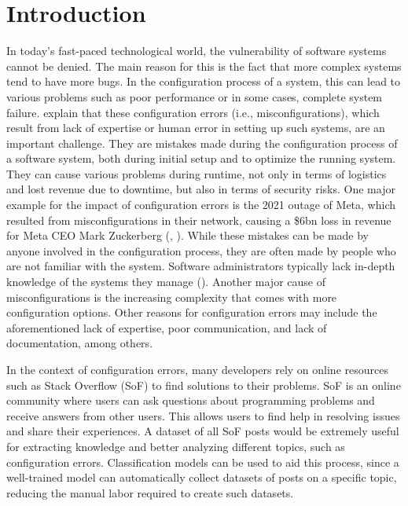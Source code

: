 \documentclass[english,bachelor]{swsLeipzig}
\begin{document}
\chapter{Introduction}\label{introduction}
In today's fast-paced technological world, the vulnerability of software systems cannot be denied. The main reason
for this is the fact that more complex systems tend to have more bugs. In the configuration process of a system, 
this can lead to various problems such as poor performance or in some cases, complete system failure. \citet{xuzhou:2015} explain that these configuration errors (i.e., misconfigurations), which result from lack of 
expertise or human error in setting up such systems, are an important challenge. They are mistakes made during 
the configuration process of a software system, both during initial setup and to optimize the running system. 
They can cause various problems during runtime, not only in terms of logistics and lost revenue due to downtime, 
but also in terms of security risks. One major example for the impact of configuration errors is the 2021 outage 
of Meta, which resulted from misconfigurations in their network, causing a \$6bn loss in revenue for Meta 
CEO Mark Zuckerberg (\citet{jana:2021}, \citet{guardian:2021}). While these mistakes can be made by anyone involved in the configuration process, 
they are often made by people who are not familiar with the system. Software administrators typically lack 
in-depth knowledge of the systems they manage (\citet{xuzhou:2015}). Another major cause of misconfigurations is the increasing 
complexity that comes with more configuration options. Other reasons for configuration errors may include the 
aforementioned lack of expertise, poor communication, and lack of documentation, among others.

In the context of configuration errors, many developers rely on online resources such as Stack Overflow (SoF) 
to find solutions to their problems. SoF is an online community where users can ask questions about programming 
problems and receive answers from other users. This allows users to find help in resolving issues and share their 
experiences. A dataset of all SoF posts would be extremely useful for extracting knowledge and better analyzing 
different topics, such as configuration errors. Classification models can be used to aid this process, 
since a well-trained model can automatically collect datasets of posts on a specific topic, reducing the manual 
labor required to create such datasets.
\end{document}
